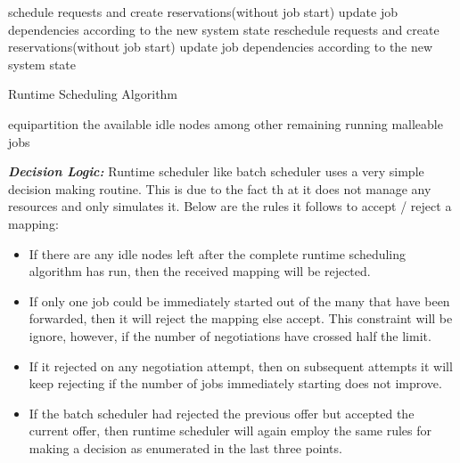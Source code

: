 \begin{algorithm}[H]
 \DontPrintSemicolon
 schedule requests and create reservations(without job start)\;
 update job dependencies according to the new system state\;
 reschedule requests and create reservations(without job start)\;
 update job dependencies according to the new system state\;
 \caption{Runtime Scheduling Algorithm}
\end{algorithm}
\pagebreak
\begin{algorithm}[!t]
 \DontPrintSemicolon
 equipartition the available idle nodes among other remaining running malleable jobs\;
\end{algorithm}
\noindent
\textbf{\textit{Decision Logic:}} Runtime scheduler like batch scheduler uses a very simple decision making routine. This is due to the fact th
at it does not manage any resources and only simulates it. Below are the rules it follows to accept / reject a mapping:
\begin{itemize}
\item If there are any idle nodes left after the complete runtime scheduling algorithm has run, then the received mapping will be rejected.
\item If only one job could be immediately started out of the many that have been forwarded, then it will reject the mapping else accept. This
constraint will be ignore, however, if the number of negotiations have crossed half the limit.
\item If it rejected on any negotiation attempt, then on subsequent attempts it will keep rejecting if the number of jobs immediately starting does not improve.
\item If the batch scheduler had rejected the previous offer but accepted the current offer, then runtime scheduler will again employ the same rules for making a decision as enumerated in the last three points.
\end{itemize}
